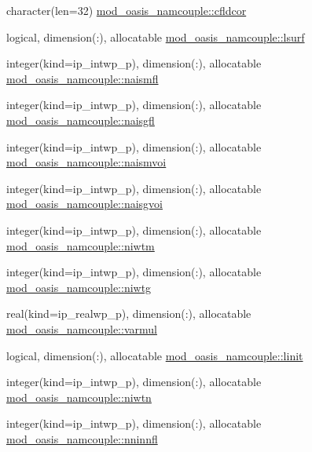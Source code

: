 \begin{DoxyCompactItemize}
\item 
character(len=32) \hyperlink{namespacemod__oasis__namcouple_a7322d891595fce1f3fb249aa936ccb33}{mod\+\_\+oasis\+\_\+namcouple\+::cfldcor}
\item 
logical, dimension(\+:), allocatable \hyperlink{namespacemod__oasis__namcouple_a902fe007f6c2505858bf72dbc64e43a2}{mod\+\_\+oasis\+\_\+namcouple\+::lsurf}
\item 
integer(kind=ip\+\_\+intwp\+\_\+p), dimension(\+:), allocatable \hyperlink{namespacemod__oasis__namcouple_a4a7cad8814c7811b364fd7d70b60b576}{mod\+\_\+oasis\+\_\+namcouple\+::naismfl}
\item 
integer(kind=ip\+\_\+intwp\+\_\+p), dimension(\+:), allocatable \hyperlink{namespacemod__oasis__namcouple_ada0ad7614eba9cc3a1e168484a520c33}{mod\+\_\+oasis\+\_\+namcouple\+::naisgfl}
\item 
integer(kind=ip\+\_\+intwp\+\_\+p), dimension(\+:), allocatable \hyperlink{namespacemod__oasis__namcouple_ae3d7c72b2f2f3ece9583cc0b25edbaba}{mod\+\_\+oasis\+\_\+namcouple\+::naismvoi}
\item 
integer(kind=ip\+\_\+intwp\+\_\+p), dimension(\+:), allocatable \hyperlink{namespacemod__oasis__namcouple_a87c0bb7c0a2cccbb673dcaf35e3dec50}{mod\+\_\+oasis\+\_\+namcouple\+::naisgvoi}
\item 
integer(kind=ip\+\_\+intwp\+\_\+p), dimension(\+:), allocatable \hyperlink{namespacemod__oasis__namcouple_a90e4ce86f77bf89c71a9277ff9b5dcbb}{mod\+\_\+oasis\+\_\+namcouple\+::niwtm}
\item 
integer(kind=ip\+\_\+intwp\+\_\+p), dimension(\+:), allocatable \hyperlink{namespacemod__oasis__namcouple_a28e887d61cc4b10c00c33a7d0f51a275}{mod\+\_\+oasis\+\_\+namcouple\+::niwtg}
\item 
real(kind=ip\+\_\+realwp\+\_\+p), dimension(\+:), allocatable \hyperlink{namespacemod__oasis__namcouple_ab7c38fd6bd90bb8e6ebfb539ead1f1a9}{mod\+\_\+oasis\+\_\+namcouple\+::varmul}
\item 
logical, dimension(\+:), allocatable \hyperlink{namespacemod__oasis__namcouple_ac124af3aecadc7ba436f2ee6caffee9a}{mod\+\_\+oasis\+\_\+namcouple\+::linit}
\item 
integer(kind=ip\+\_\+intwp\+\_\+p), dimension(\+:), allocatable \hyperlink{namespacemod__oasis__namcouple_a63c2f2977f9cc4839f6bdec7bbbc5fa7}{mod\+\_\+oasis\+\_\+namcouple\+::niwtn}
\item 
integer(kind=ip\+\_\+intwp\+\_\+p), dimension(\+:), allocatable \hyperlink{namespacemod__oasis__namcouple_a579387e570e26f2d6c6c2159824cf8a3}{mod\+\_\+oasis\+\_\+namcouple\+::nninnfl}

\end{DoxyCompactItemize}
